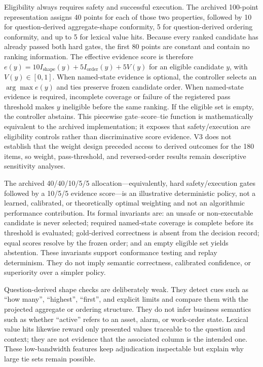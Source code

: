 \documentclass[applsci,article,submit,moreauthors]{Definitions/mdpi}
\begin{document}
Eligibility always requires safety and successful execution. The archived 100-point representation assigns 40 points for each of those two properties, followed by 10 for question-derived aggregate-shape conformity, 5 for question-derived ordering conformity, and up to 5 for lexical value hits. Because every ranked candidate has already passed both hard gates, the first 80 points are constant and contain no ranking information. The effective evidence score is therefore $e(y)=10I_{\mathrm{shape}}(y)+5I_{\mathrm{order}}(y)+5V(y)$ for an eligible candidate $y$, with $V(y)\in[0,1]$. When named-state evidence is optional, the controller selects an $\arg\max e(y)$ and ties preserve frozen candidate order. When named-state evidence is required, incomplete coverage or failure of the registered pass threshold makes $y$ ineligible before the same ranking. If the eligible set is empty, the controller abstains. This piecewise gate--score--tie function is mathematically equivalent to the archived implementation; it exposes that safety/execution are eligibility controls rather than discriminative score evidence. V3 does not establish that the weight design preceded access to derived outcomes for the 180 items, so weight, pass-threshold, and reversed-order results remain descriptive sensitivity analyses.

The archived 40/40/10/5/5 allocation---equivalently, hard safety/execution gates followed by a 10/5/5 evidence score---is an illustrative deterministic policy, not a learned, calibrated, or theoretically optimal weighting and not an algorithmic performance contribution. Its formal invariants are: an unsafe or non-executable candidate is never selected; required named-state coverage is complete before its threshold is evaluated; gold-derived correctness is absent from the decision record; equal scores resolve by the frozen order; and an empty eligible set yields abstention. These invariants support conformance testing and replay determinism. They do not imply semantic correctness, calibrated confidence, or superiority over a simpler policy.

Question-derived shape checks are deliberately weak. They detect cues such as ``how many'', ``highest'', ``first'', and explicit limits and compare them with the projected aggregate or ordering structure. They do not infer business semantics such as whether ``active'' refers to an asset, alarm, or work-order state. Lexical value hits likewise reward only presented values traceable to the question and context; they are not evidence that the associated column is the intended one. These low-bandwidth features keep adjudication inspectable but explain why large tie sets remain possible.
\end{document}
